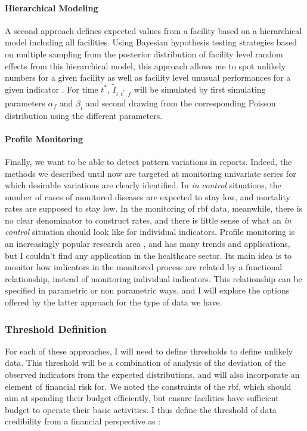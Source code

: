 \paragraph{Hierarchical Modeling} A second approach defines expected values from a facility based on a hierarchical model including all facilities. Using Bayesian hypothesis testing strategies based on multiple sampling from the posterior distribution of facility level random effects from this hierarchical model, this approach allows me to spot unlikely numbers for a given facility as well as facility level unusual performances for a given indicator \citep{ohlssen_hierarchical_2007}.
For time $t^{*}$, $\tilde{I}_{i,t^{*},f}$ will be simulated by first simulating parameters $\alpha_f$ and $\beta_i$ and second drawing from the corresponding Poisson distribution using the different parameters.

\paragraph{Profile Monitoring} Finally, we want to be able to detect pattern variations in reports. Indeed, the methods we described until now are targeted at monitoring univariate series for which desirable variations are clearly identified. In \textit{in control} situations, the number of cases of monitored diseases are expected to stay low, and mortality rates are supposed to stay low. In the monitoring of \gls{rbf} data, meanwhile, there is no clear denominator to construct rates, and there is little sense of what an \textit{in control} situation should look like for individual indicators. Profile  monitoring is an increasingly popular research area \citep{woodall_current_2014}, and has many trends and applications, but I couldn't find any application in the healthcare sector. Its main idea is to monitor how indicators in the monitored process are related by a functional relationship, instead of monitoring individual indicators. This relationship can be specified in parametric \citep{mahmoud_simple_2011} or non parametric ways\citep{chicken_nonparametric_2011}, and I will explore the options offered by the latter approach for the type of data we have.

\subsubsection{Threshold Definition}

For each of these approaches, I will need to define thresholds to define unlikely data. This threshold will be a combination of analysis of the deviation of the observed indicators from the expected distributions, and will also incorporate an element of financial risk for. We noted the constraints of the \gls{rbf}, which should aim at spending their budget efficiently, but ensure facilities have sufficient budget to operate their basic activities. I thus define the threshold of data credibility from a financial perspective as :

